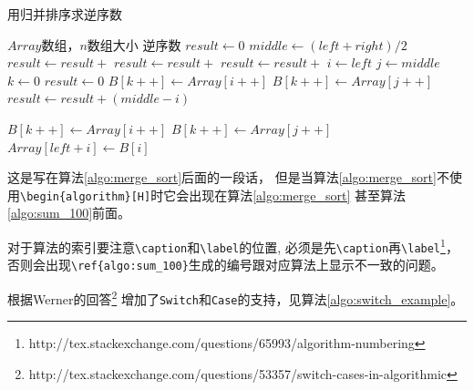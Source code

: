 \documentclass[doctor,openright,twoside]{sjtuthesis}
\theoremstyle{plain}
\theoremstyle{definition}
\theoremstyle{remark}
\theoremstyle{ocrenumbox}
\theoremstyle{plain}
\begin{document}
\begin{algorithm}
\caption{用归并排序求逆序数}
\label{algo:merge_sort}
\begin{algorithmic}[1] %
\Require $Array$数组，$n$数组大小 %
\Ensure 逆序数 %
  \State $result \gets 0$
    \State $middle \gets (left + right) / 2$
    \State $result \gets result +$ 
    \State $result \gets result +$ 
    \State $result \gets result +$ 
  \EndIf
  \State {}
\EndFunction
\State %
  \State $i\gets left$
  \State $j\gets middle$
  \State $k\gets 0$
  \State $result \gets 0$
      \State $B[k++]\gets Array[i++]$
    \Else
      \State $B[k++] \gets Array[j++]$
      \State $result \gets result + (middle - i)$
    \EndIf
  \EndWhile
\end{algorithmic}
\end{algorithm}

\begin{algorithm}
\begin{algorithmic}[1]
    \State $B[k++] \gets Array[i++]$
  \EndWhile
    \State $B[k++] \gets Array[j++]$
  \EndWhile
    \State $Array[left + i] \gets B[i]$
  \EndFor
  \State {}
\EndFunction
\end{algorithmic}
\end{algorithm}

这是写在算法\ref{algo:merge_sort}后面的一段话，
但是当算法\ref{algo:merge_sort}不使用\verb+\begin{algorithm}[H]+时它会出现在算法\ref{algo:merge_sort}
甚至算法\ref{algo:sum_100}前面。

对于算法的索引要注意\verb+\caption+和\verb+\label+的位置,
必须是先\verb+\caption+再\verb+\label+\footnote{http://tex.stackexchange.com/questions/65993/algorithm-numbering}，
否则会出现\verb+\ref{algo:sum_100}+生成的编号跟对应算法上显示不一致的问题。

根据Werner的回答\footnote{http://tex.stackexchange.com/questions/53357/switch-cases-in-algorithmic}
增加了\verb+Switch+和\verb+Case+的支持，见算法\ref{algo:switch_example}。
\end{document}
